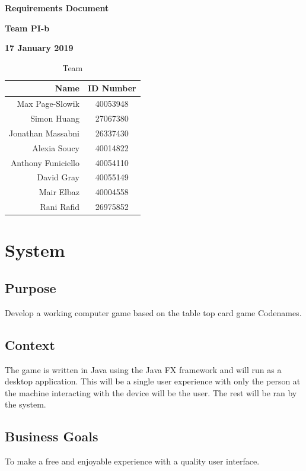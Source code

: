 \documentclass[12pt]{article}
\begin{document}
\vspace*{0.5in}
\centerline{\bf\Large Requirements Document}

\vspace*{0.5in}
\centerline{\bf\Large Team PI-b}

\vspace*{0.5in}
\centerline{\bf\Large 17 January 2019}

\vspace*{1.5in}
\begin{table}[htbp]
\caption{Team}
\begin{center}
\begin{tabular}{|r | c|}
\hline
Name & ID Number \\
\hline\hline
Max Page-Slowik & 40053948 \\
\hline
Simon Huang & 27067380 \\
\hline
Jonathan Massabni & 26337430 \\
\hline
Alexia Soucy & 40014822 \\
\hline
Anthony Funiciello& 40054110\\
\hline
    David Gray&40055149\\
\hline
Mair Elbaz&40004558\\
\hline
Rani Rafid&26975852\\
\hline
\end{tabular}
\end{center}
\end{table}

\clearpage

\section{System}

\subsection{Purpose}
Develop a working computer game based on the table top card game Codenames.
\subsection{Context}
The game is written in Java using the Java FX framework and will run as a desktop application. This will be a single user experience with only the person at the machine interacting with the device will be the user. The rest will be ran by the system.
\subsection{Business Goals}
To make a free and enjoyable experience with a quality user interface.
\end{document}
